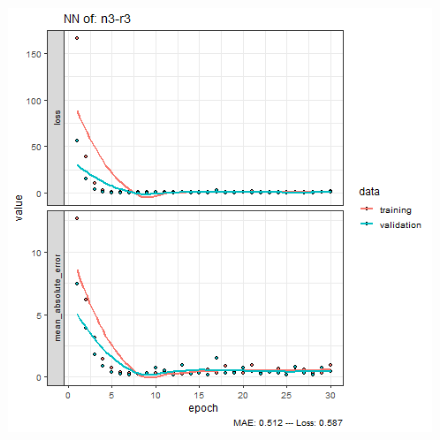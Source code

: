 \documentclass{FR16}
\begin{document}
\begin{figure}[!htb]
\begin{minipage}{0.33\textwidth}
   \end{minipage}
   \begin{minipage}{0.33\textwidth}
     \centering
     \includegraphics[width=1\linewidth]{figures/NN-n3-r3.png} 
   \end{minipage}\hfill 
\end{figure}
\end{document}
